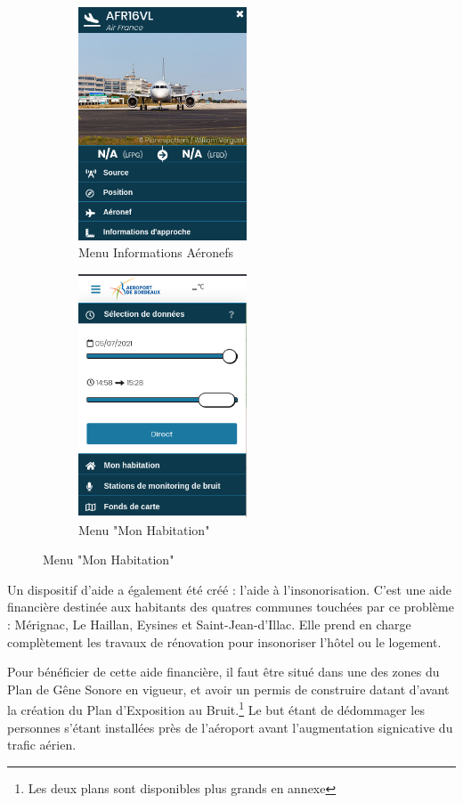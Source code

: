 \begin{figure}[hbt!]
  \begin{subfigure}{0.5\textwidth}
    \centering
    \includegraphics[width=5cm]{Images/aerovisioninfo.png}  
    \caption{Menu Informations Aéronefs}
    \label{fig:aerovisioninfo}
  \end{subfigure}
  \begin{subfigure}{0.5\textwidth}
    \centering
    \includegraphics[width=5cm]{Images/aerovisionmaison.png}  
    \caption{Menu "Mon Habitation"}
    \label{fig:aerovisionmaison}
  \end{subfigure}
\end{figure}

Un dispositif d'aide a également été créé : l'aide à l'insonorisation.
C'est une aide financière destinée aux habitants des quatres communes touchées par ce problème : Mérignac, Le Haillan, Eysines et Saint-Jean-d'Illac. Elle prend en charge complètement les travaux de rénovation pour insonoriser l'hôtel ou le logement.

Pour bénéficier de cette aide financière, il faut être situé dans une des zones du Plan de Gêne Sonore en vigueur, et avoir un permis de construire datant d'avant la création du Plan d'Exposition au Bruit.\footnote{Les deux plans sont disponibles plus grands en annexe}
Le but étant de dédommager les personnes s'étant installées près de l'aéroport avant l'augmentation signicative du trafic aérien.

